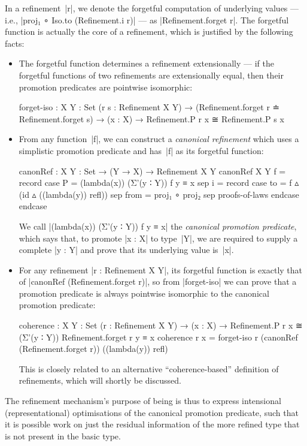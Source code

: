 In a refinement~|r|, we denote the forgetful computation of underlying values --- i.e., |proj₁ ∘ Iso.to (Refinement.i r)| --- as |Refinement.forget r|.
The forgetful function is actually the core of a refinement, which is justified by the following facts:
\begin{itemize}
\item The forgetful function determines a refinement extensionally --- if the forgetful functions of two refinements are extensionally equal, then their promotion predicates are pointwise isomorphic:
\begin{code}
forget-iso :  {X Y : Set} (r s : Refinement X Y) →
              (Refinement.forget r ≐ Refinement.forget s) →
              (x : X) → Refinement.P r x ≅ Refinement.P s x
\end{code}
\item From any function~|f|, we can construct a \emph{canonical refinement} which uses a simplistic promotion predicate and has~|f| as its forgetful function:
\begin{code}
canonRef : {X Y : Set} → (Y → X) → Refinement X Y
canonRef {X} {Y} f = record
  case  P  =  (lambda(x)) (Σ'(y ∶ Y)) f y ≡ x
  sep   i  =  record  case  to    =  f ▵ (id ▵ ((lambda(y)) refl))
                      sep   from  =  proj₁ ∘ proj₂
                      sep   proofs-of-laws endcase endcase
\end{code}
We call |(lambda(x)) (Σ'(y ∶ Y)) f y ≡ x| the \emph{canonical promotion predicate}, which says that, to promote |x : X| to type~|Y|, we are required to supply a complete |y : Y| and prove that its underlying value is~|x|.
\item For any refinement |r : Refinement X Y|, its forgetful function is exactly that of |canonRef (Refinement.forget r)|, so from |forget-iso| we can prove that a promotion predicate is always pointwise isomorphic to the canonical promotion predicate:
\begin{code}
coherence :  {X Y : Set} (r : Refinement X Y) →
             (x : X) →  Refinement.P r x
                          ≅ (Σ'(y ∶ Y)) Refinement.forget r y ≡ x
coherence r x = forget-iso r (canonRef (Refinement.forget r)) ((lambda(y)) refl)
\end{code}
This is closely related to an alternative ``coherence-based'' definition of refinements, which will shortly be discussed.
\end{itemize}
The refinement mechanism's purpose of being is thus to express intensional (representational) optimisations of the canonical promotion predicate, such that it is possible work on just the residual information of the more refined type that is not present in the basic type.

